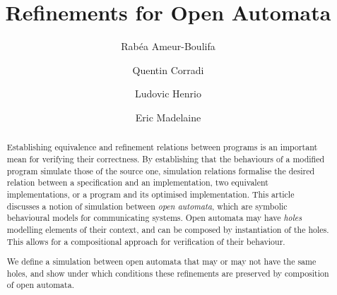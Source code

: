 \documentclass[runningheads]{llncs}
\begin{document}
%
\title{Refinements for Open Automata}



%
%
\author{
Rabéa Ameur-Boulifa \and
Quentin Corradi \and
Ludovic Henrio  \and
Eric Madelaine }
%
%
%
\maketitle              %
%
\begin{abstract}

Establishing equivalence and refinement relations between programs is an important mean for 
verifying their correctness. By establishing that the
behaviours of a modified program simulate those of the source one, simulation relations formalise the desired relation between a specification and an implementation, 
 two equivalent implementations, or a program and its optimised implementation.
This article discusses a notion of simulation between \emph{open automata}, which are symbolic
behavioural models for communicating systems. 
Open automata may have \emph{holes} modelling elements of their
context, and can be composed by instantiation of the holes. This allows for a compositional approach for
verification of their behaviour.

We define a simulation between open automata that may or may not have the same holes, and 
show under which conditions these refinements are preserved by composition of open automata. 


\end{abstract}
%
%
%
\end{document}
